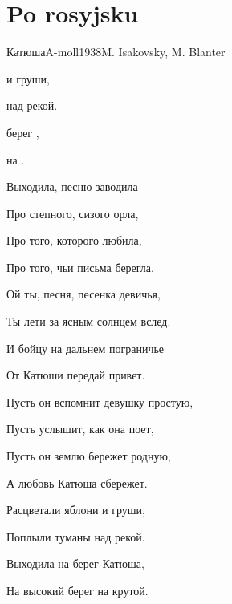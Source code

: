 \documentclass[a4paper,draft]{book}
\begin{document}
\chapter{Po rosyjsku}
\begin{otherlanguage}{russian}
\begin{song}{Катюша}{A-moll}{1938}{M. Isakovsky, M. Blanter}{}{}
	\begin{SBVerse}
	  и груши,

	  над рекой.

	  берег ,

	   на .
	\end{SBVerse}
	\begin{SBVerse}
	Выходила, песню заводила

	Про степного, сизого орла,

	Про того, которого любила,

	Про того, чьи письма берегла.
	\end{SBVerse}
	\begin{SBVerse}
	Ой ты, песня, песенка девичья,

	Ты лети за ясным солнцем вслед.

	И бойцу на дальнем пограничье

	От Катюши передай привет.
	\end{SBVerse}
	\begin{SBVerse}
	Пусть он вспомнит девушку простую,

	Пусть услышит, как она поет,

	Пусть он землю бережет родную,

	А любовь Катюша сбережет.
	\end{SBVerse}
	\begin{SBVerse}
	Расцветали яблони и груши,

	Поплыли туманы над рекой.

	Выходила на берег Катюша,

	На высокий берег на крутой.
	\end{SBVerse}
\end{song}
\end{otherlanguage}
\end{document}
